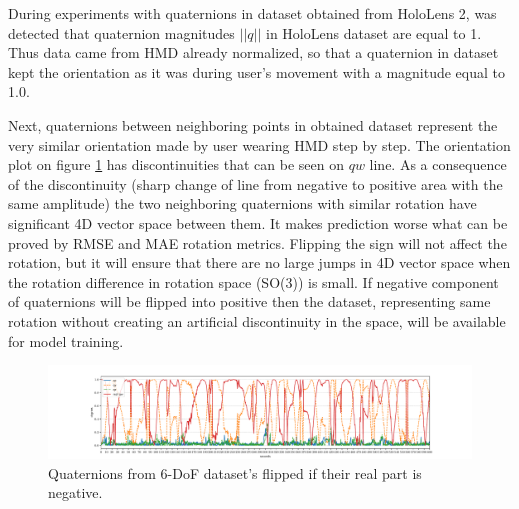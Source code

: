 During experiments with quaternions in dataset obtained from HoloLens 2, was detected that quaternion magnitudes $|| q ||$ in HoloLens dataset are equal to 1. Thus data came from HMD already normalized, so that a quaternion in dataset kept the orientation as it was during user's movement with a magnitude equal to 1.0.

Next, quaternions between neighboring points in obtained dataset represent the very similar orientation made by user wearing HMD step by step. The orientation plot on figure \ref{fig:norm_data} has discontinuities that can be seen on $qw$ line. As a consequence of the discontinuity (sharp change of line from negative to positive area with the same amplitude) the two neighboring quaternions with similar rotation have significant 4D vector space between them. It makes prediction worse what can be proved by RMSE and MAE rotation metrics. Flipping the sign will not affect the rotation, but it will ensure that there are no large jumps in 4D vector space when the rotation difference in rotation space (SO(3)) is small. If negative component of quaternions will be flipped into positive then the dataset, representing same rotation without creating an artificial discontinuity in the space, will be available for model training. 

\begin{figure}[htb]
	\begin{center}
		\includegraphics[width=1\textwidth, keepaspectratio]{gfx/Fig-1556-quaternions_flipped.pdf}
		\caption{\label{fig:norm_data} Quaternions from 6-DoF dataset's flipped if their real part is negative.}
	\end{center}
\end{figure}

